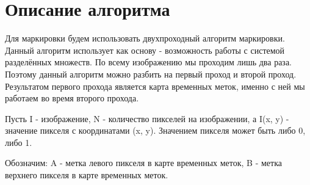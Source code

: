 \documentclass{report}
\begin{document}
	\section*{Описание алгоритма}
		\par Для маркировки будем использовать двухпроходный алгоритм маркировки. Данный алгоритм использует как основу - возможность работы с системой разделённых множеств. По всему изображению мы проходим лишь два раза. Поэтому данный алгоритм можно разбить на первый проход и второй проход. Результатом первого прохода является карта временных меток, именно с ней мы работаем во время второго прохода.
		\par Пусть I - изображение, N - количество пикселей на изображении, а I(x, y) - значение пикселя с координатами (x, y). Значением пикселя может быть либо 0, либо 1.
		\par Обозначим: A - метка левого пикселя в карте временных меток, B - метка верхнего пикселя в карте временных меток.
\end{document}
